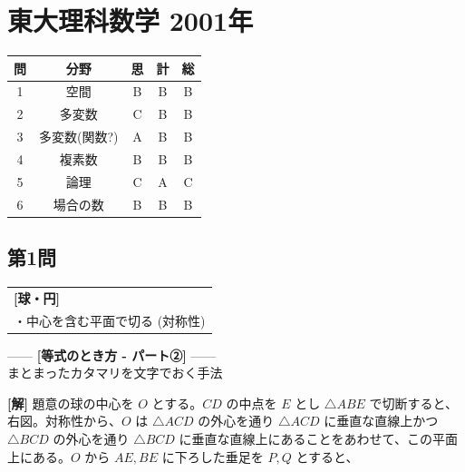 \documentclass[../main.tex]{subfiles}
\begin{document}
\section*{東大理科数学 2001年}

\begin{center}
  \begin{tabular}{|c|c|c|c|c|}
    \hline
    問 & 分野 & 思 & 計 & 総 \\ \hline
    1 & 空間 & B & B & B \\ \hline
    2 & 多変数 & C & B & B \\ \hline
    3 & 多変数(関数?) & A & B & B \\ \hline
    4 & 複素数 & B & B & B \\ \hline
    5 & 論理 & C & A & C \\ \hline
    6 & 場合の数 & B & B & B \\ \hline
  \end{tabular}
\end{center}

\bigskip

\subsection*{第1問}

\begin{center}
  \begin{tabular}{|l|}
    \hline
    \textbf{[球・円]} \\
    ・中心を含む平面で切る (対称性) \\
    \hline
  \end{tabular}
\end{center}

\noindent
—— \textbf{[等式のとき方 - パート②]} —— \\
まとまったカタマリを文字でおく手法

\bigskip

\noindent
\textbf{[解]}
題意の球の中心を $O$ とする。$CD$ の中点を $E$ とし $\triangle ABE$ で切断すると、右図。対称性から、$O$ は $\triangle ACD$ の外心を通り $\triangle ACD$ に垂直な直線上かつ $\triangle BCD$ の外心を通り $\triangle BCD$ に垂直な直線上にあることをあわせて、この平面上にある。$O$ から $AE, BE$ に下ろした垂足を $P, Q$ とすると、
\end{document}
